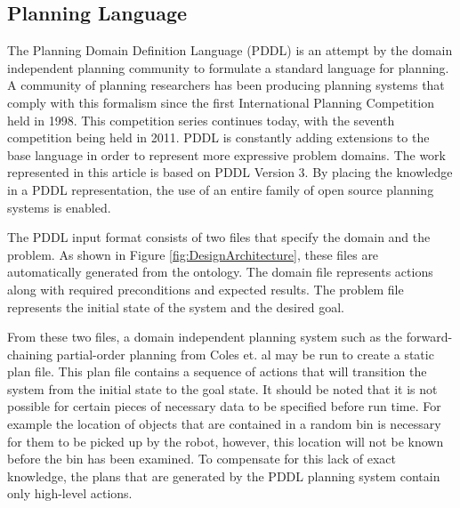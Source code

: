 \subsection{Planning Language}
The Planning Domain Definition Language (PDDL) \cite{PDDL} is an attempt by the
domain independent planning community to formulate a standard language
for planning. A community of planning researchers has been producing
planning systems that comply with this formalism since the first International
Planning Competition held in 1998. This competition series continues today,
with the seventh competition being held in 2011. PDDL is constantly
adding extensions to the base language in order to represent more expressive
problem domains. The work represented in this article is based on PDDL Version 3.
By placing the knowledge in a PDDL representation, the use of an
entire family of open source planning systems is enabled.

The PDDL input format consists
of two files that specify the domain and the problem. As shown in Figure
\ref{fig:DesignArchitecture}, these files are automatically
generated from the ontology. The domain file represents actions along
with required preconditions and expected results. The problem file
represents the initial state of the system and the desired goal.

From these two files, a domain independent planning system such as
the forward-chaining partial-order planning from Coles et. al
\cite{Coles.ICAPS.2010} may be run to create a static plan file. This
plan file contains a sequence of actions that will transition the
system from the initial state to the goal state. It should be noted that
it is not possible for certain pieces of necessary data to be specified before
run time. For example the location of objects that are contained
in a random bin is necessary for them to be picked up by the robot,
however, this location will not be known before the bin has been examined.
To compensate for this lack of exact knowledge, the plans that are
generated by the PDDL planning system contain only high-level actions.

